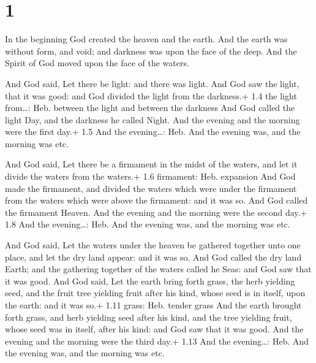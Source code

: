 \hypertarget{section}{%
\section{1}\label{section}}

 In the beginning God created the heaven and the earth.
 And the earth was without form, and void; and darkness was
upon the face of the deep. And the Spirit of God moved upon the face of
the waters.

 And God said, Let there be light: and there was light.
 And God saw the light, that it was good: and God divided
the light from the darkness.+ 1.4 the light from\ldots: Heb. between the
light and between the darkness  And God called the light
Day, and the darkness he called Night. And the evening and the morning
were the first day.+ 1.5 And the evening\ldots: Heb. And the evening
was, and the morning was etc.

 And God said, Let there be a firmament in the midst of
the waters, and let it divide the waters from the waters.+ 1.6
firmament: Heb. expansion  And God made the firmament, and
divided the waters which were under the firmament from the waters which
were above the firmament: and it was so.  And God called the
firmament Heaven. And the evening and the morning were the second day.+
1.8 And the evening\ldots: Heb. And the evening was, and the morning was
etc.

 And God said, Let the waters under the heaven be gathered
together unto one place, and let the dry land appear: and it was so.
 And God called the dry land Earth; and the gathering
together of the waters called he Seas: and God saw that it was good.
 And God said, Let the earth bring forth grass, the herb
yielding seed, and the fruit tree yielding fruit after his kind, whose
seed is in itself, upon the earth: and it was so.+ 1.11 grass: Heb.
tender grass  And the earth brought forth grass, and herb
yielding seed after his kind, and the tree yielding fruit, whose seed
was in itself, after his kind: and God saw that it was good.
 And the evening and the morning were the third day.+ 1.13
And the evening\ldots: Heb. And the evening was, and the morning was
etc.

